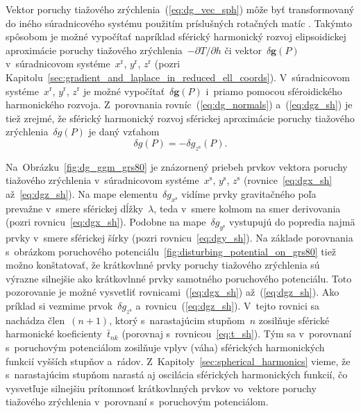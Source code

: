 \documentclass[a4paper, 12pt]{book}
\let\vec\mathbf
\begin{document}
Vektor poruchy tiažového zrýchlenia~(\ref{eq:dg_vec_sph}) môže byť 
transformovaný do iného súradnicového systému použitím príslušných rotačných 
matíc \parencite[pozri napríklad][]{WGS84}.  Takýmto spôsobom je možné 
vypočítať napríklad sférický harmonický rozvoj elipsoidickej aproximácie 
poruchy tiažového zrýchlenia~$-\partial T \slash \partial h$ či vektor~$\delta 
\vec g(P)$ v~súradnicovom systéme~$x^\mathrm{r}$, $y^\mathrm{r}$, 
$z^\mathrm{r}$ (pozri 
Kapitolu~\ref{sec:gradient_and_laplace_in_reduced_ell_coords}).  V~súradnicovom 
systéme~$x^\mathrm{r}$, $y^\mathrm{r}$, $z^\mathrm{r}$ je možné 
vypočítať~$\delta \vec g(P)$ i~priamo pomocou sféroidického harmonického 
rozvoja.  Z~porovnania rovníc~(\ref{eq:dg_normals}) a~(\ref{eq:dgz_sh}) je tiež 
zrejmé, že sférický harmonický rozvoj sférickej aproximácie poruchy tiažového 
zrýchlenia~$\delta g(P)$ je daný vzťahom
%
\begin{equation}
\label{eq:dg_sh_sa}
\delta g(P) = -\delta g_{z^\mathrm{s}}(P){.}
\end{equation}

Na~Obrázku~\ref{fig:dg_ggm_grs80} je znázornený priebeh prvkov vektora poruchy 
tiažového zrýchlenia v~súradnicovom systéme~$x^\mathrm{s}$, $y^\mathrm{s}$, 
$z^\mathrm{s}$ (rovnice~\ref{eq:dgx_sh} až~\ref{eq:dgz_sh}).  Na mape 
elementu~$\delta g_{x^\mathrm{s}}$ vidíme prvky gravitačného poľa prevažne 
v~smere sférickej dĺžky~$\lambda$, teda v~smere kolmom na smer derivovania 
(pozri rovnicu~\ref{eq:dgx_sh}).  Podobne na mape~$\delta g_{y^\mathrm{s}}$ 
vystupujú do popredia najmä prvky v~smere sférickej šírky (pozri 
rovnicu~\ref{eq:dgy_sh}).  Na základe porovnania s~obrázkom poruchového 
potenciálu~\ref{fig:disturbing_potential_on_grs80} tiež možno konštatovať, že 
krátkovlnné prvky poruchy tiažového zrýchlenia sú výrazne silnejšie ako 
krátkovlnné prvky samotného poruchového potenciálu.  Toto pozorovanie je možné 
vysvetliť rovnicami~(\ref{eq:dgx_sh}) až~(\ref{eq:dgz_sh}).  Ako príklad si 
vezmime prvok~$\delta g_{z^\mathrm{s}}$ a~rovnicu~(\ref{eq:dgz_sh}).  V~tejto 
rovnici sa nachádza člen~$(n + 1)$, ktorý s~narastajúcim stupňom~$n$ zosilňuje 
sférické harmonické koeficienty~$\bar{t}_{nk}$ (porovnaj 
s~rovnicou~\ref{eq:t_sh}).  Tým sa v~porovnaní s~poruchovým potenciálom 
zosilňuje vplyv (váha) sférických harmonických funkcií vyšších stupňov a~rádov.  
Z~Kapitoly~\ref{sec:spherical_harmonics} vieme, že s~narastajúcim stupňom 
narastá aj oscilácia sférických harmonických funkcií, čo vysvetľuje silnejšiu 
prítomnosť krátkovlnných prvkov vo~vektore poruchy tiažového zrýchlenia 
v~porovnaní s~poruchovým potenciálom.
\end{document}
